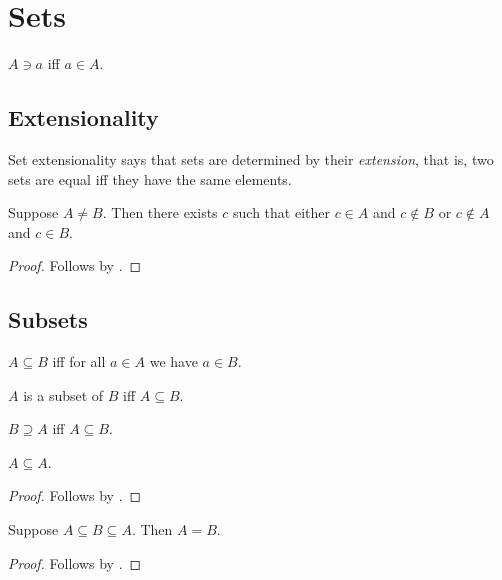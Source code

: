\section{Sets}

\begin{abbreviation}\label{ni}
    $A\ni a$ iff $a\in A$.
\end{abbreviation}

\subsection{Extensionality}

Set extensionality says that sets are determined by their \textit{extension},
that is, two sets are equal iff they have the same elements.

\begin{proposition}%
\label{neq_witness}
    Suppose $A\neq B$.
    Then there exists $c$ such that
    either $c\in A$ and $c\not\in B$
    or $c\not\in A$ and $c\in B$.
\end{proposition}
\begin{proof}
    Follows by .
\end{proof}



\subsection{Subsets}

\begin{definition}\label{subseteq}
    $A\subseteq B$ iff
    for all $a\in A$ we have $a\in B$.
\end{definition}

\begin{abbreviation}\label{is_subset}
    $A$ is a subset of $B$ iff $A\subseteq B$.
\end{abbreviation}

\begin{abbreviation}\label{supseteq}
    $B\supseteq A$ iff $A\subseteq B$.
\end{abbreviation}

\begin{proposition}%
\label{subseteq_refl}
    $A\subseteq A$.
\end{proposition}
\begin{proof}
    Follows by .
\end{proof}

\begin{proposition}%
\label{subseteq_antisymmetric}
    Suppose $A\subseteq B\subseteq A$.
    Then $A = B$.
\end{proposition}
\begin{proof}
    Follows by .
\end{proof}

